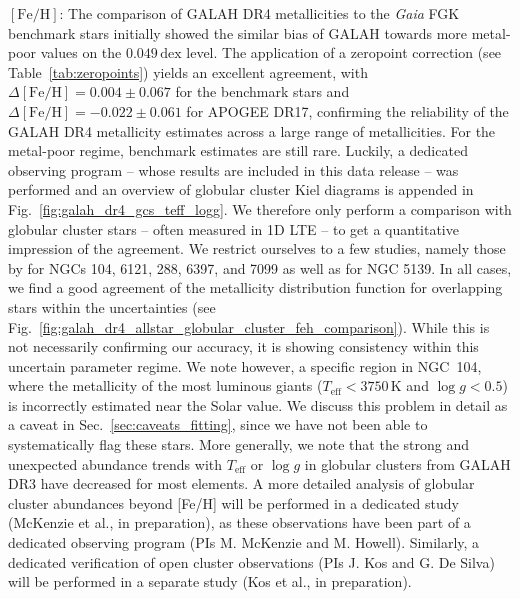 \documentclass[
  journal=pasa,
  manuscript=research-paper, %
  year=2024,
  volume=37
]{cup-journal}
\newcommand{\Teff}{$T_\mathrm{eff}$\xspace}
\newcommand{\logg}{$\log g$\xspace}
\newcommand{\feh}{$\mathrm{[Fe/H]}$\xspace}
\newcommand{\Gaia}{\textit{Gaia}\xspace}
\begin{document}
\feh: The comparison of GALAH DR4 metallicities to the \Gaia FGK benchmark stars initially showed the similar bias of GALAH towards more metal-poor values on the $0.049\,\mathrm{dex}$ level. The application of a zeropoint correction (see Table~\ref{tab:zeropoints}) yields an excellent agreement, with $\Delta \mathrm{[Fe/H]} = 0.004 \pm 0.067$ for the benchmark stars and $\Delta \mathrm{[Fe/H]} = -0.022 \pm 0.061$ for APOGEE DR17, confirming the reliability of the GALAH DR4 metallicity estimates across a large range of metallicities. For the metal-poor regime, benchmark estimates are still rare. Luckily, a dedicated observing program -- whose results are included in this data release -- was performed and an overview of globular cluster Kiel diagrams is appended in Fig.~\ref{fig:galah_dr4_gcs_teff_logg}. We therefore only perform a comparison with globular cluster stars -- often measured in 1D LTE -- to get a quantitative impression of the agreement. We restrict ourselves to a few studies, namely those by \citet{Carretta2009, Carretta2009c} for NGCs 104, 6121, 288, 6397, and 7099 as well as \citet{Johnson2010} for NGC 5139. In all cases, we find a good agreement of the metallicity distribution function for overlapping stars within the uncertainties (see Fig.~\ref{fig:galah_dr4_allstar_globular_cluster_feh_comparison}). While this is not necessarily confirming our accuracy, it is showing consistency within this uncertain parameter regime. We note however, a specific region in NGC~104, where the metallicity of the most luminous giants ($T_\mathrm{eff} < 3750\,\mathrm{K}$ and $\log g < 0.5$) is incorrectly estimated near the Solar value. We discuss this problem in detail as a caveat in Sec.~\ref{sec:caveats_fitting}, since we have not been able to systematically flag these stars. More generally, we note that the strong and unexpected abundance trends with \Teff or \logg in globular clusters from GALAH DR3 have decreased for most elements. A more detailed analysis of globular cluster abundances beyond [Fe/H] will be performed in a dedicated study (McKenzie et al., in preparation), as these observations have been part of a dedicated observing program (PIs M. McKenzie and M. Howell). Similarly, a dedicated verification of open cluster observations (PIs J. Kos and G. De Silva) will be performed in a separate study (Kos et al., in preparation).
\end{document}
